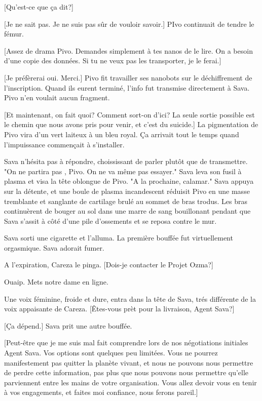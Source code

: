 [Qu'est-ce que ça dit?] 

[Je ne sait pas. Je ne suis pas sûr de vouloir savoir.] PIvo continuait de tendre le fémur. 

[Assez de drama Pivo. Demandes simplement à tes nanos de le lire. On a besoin d'une copie des données. Si tu ne veux pas les transporter, je le ferai.] 

[Je préfèrerai oui. Merci.] Pivo fit travailler ses nanobots  sur le déchiffrement de l'inscription. Quand ils eurent terminé, l'info fut transmise directement à Sava. Pivo n'en voulait aucun fragment. 

[Et maintenant, on fait quoi? Comment sort-on d'ici? La seule sortie possible est le chemin que nous avons pris pour venir, et c'est du suicide.] La pigmentation de Pivo vira d'un vert laiteux à un bleu royal. Ça arrivait tout le temps quand l'impuissance commençait à s'installer. 

Sava n'hésita pas à répondre, choississant de parler plutôt que de transmettre. "On ne partira pas , Pivo. On ne va même pas essayer." Sava leva son fusil à plasma et visa la tête oblongue de Pivo. "A la prochaine, calamar." Sava appuya sur la détente, et une boule de plasma incandescent réduisit Pivo en une masse tremblante et sanglante de  cartilage brulé au sommet de bras trodus. Les bras continuèrent de bouger au sol dans une marre de sang bouillonant pendant que Sava s'assit à côté d'une pile d'ossements et se reposa contre le mur. 

Sava sorti une cigarette et l'alluma. La première bouffée fut virtuellement orgasmique. Sava adorait fumer. 

A l'expiration, Careza le pinga. [Dois-je contacter le Projet Ozma?] 

Ouaip. Mets notre dame en ligne. 

Une voix féminine, froide et dure, entra dans la tête de Sava, trés différente de la voix appaisante de Careza. [Êtes-vous prèt pour la livraison, Agent Sava?] 

[Ça dépend.] Sava prit une autre bouffée. 

[Peut-être que je me suis mal fait comprendre lors de nos négotiations initiales Agent Sava. Vos options sont quelques peu limitées. Vous ne pourrez manifestement pas quitter la planète vivant, et nous ne pouvons nous permettre de perdre cette information, pas plus que nous pouvons nous permettre qu'elle parviennent entre les mains de votre organisation. Vous allez devoir vous en tenir à vos engagements, et faites moi confiance, nous ferons pareil.] 

